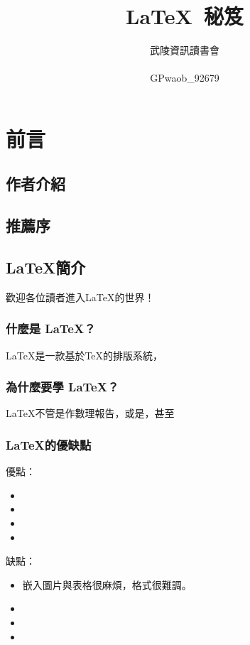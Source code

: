 \documentclass[14pt, oneside]{extbook}
\title{
	\sffamily\Huge \textrm{\LaTeX}\ 秘笈
}
\author{
	\sffamily\LARGE 武陵資訊讀書會 \\\\
	\fontspec{Torus}{}\LARGE GPwaob\_92679
}
\date{}
\begin{document}
	\maketitle
	\tableofcontents


	\part{前言}
	\chapter*{作者介紹}
		
	\chapter*{推薦序}
			
			
			
		
		
		
		
		
	\chapter{\LaTeX 簡介}
		歡迎各位讀者進入\LaTeX 的世界！
	\section{什麼是 \LaTeX ？}
		\LaTeX 是一款基於\TeX 的排版系統，
	\section{為什麼要學 \LaTeX ？}
		\LaTeX 不管是作數理報告，或是，甚至
	\section{\LaTeX 的優缺點}
		優點：
		\begin{itemize}
			\item 
			\item 
			\item 
			\item 
		\end{itemize}				
		缺點：
		\begin{itemize}
			\item 嵌入圖片與表格很麻煩，格式很難調。
			\item 
			\item 
			\item 		
		\end{itemize}
\end{document}
